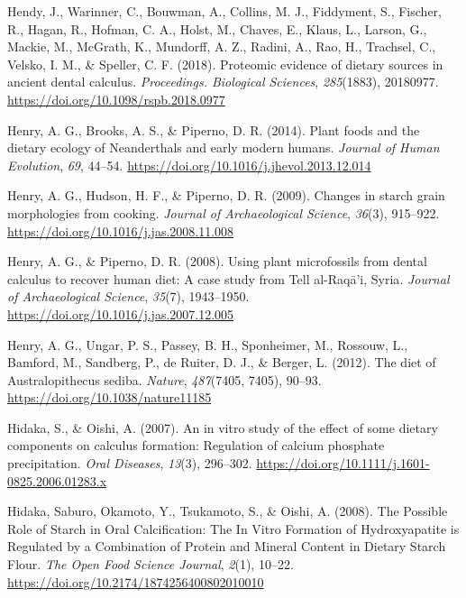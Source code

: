 \documentclass[
  letterpaper,
]{book}
\newlength{\cslhangindent}
\newlength{\cslentryspacingunit} %
\newenvironment{CSLReferences}[2] %
 {%
  \setlength{\parindent}{0pt}
  \ifodd #1
  \let\oldpar\par
  \def\par{\hangindent=\cslhangindent\oldpar}
  \fi
  \setlength{\parskip}{#2\cslentryspacingunit}
 }%
 {}
\begin{document}
\begin{CSLReferences}{1}{0}
\leavevmode{}%
Hendy, J., Warinner, C., Bouwman, A., Collins, M. J., Fiddyment, S.,
Fischer, R., Hagan, R., Hofman, C. A., Holst, M., Chaves, E., Klaus, L.,
Larson, G., Mackie, M., McGrath, K., Mundorff, A. Z., Radini, A., Rao,
H., Trachsel, C., Velsko, I. M., \& Speller, C. F. (2018). Proteomic
evidence of dietary sources in ancient dental calculus.
\emph{Proceedings. Biological Sciences}, \emph{285}(1883), 20180977.
\url{https://doi.org/10.1098/rspb.2018.0977}

\leavevmode{}%
Henry, A. G., Brooks, A. S., \& Piperno, D. R. (2014). Plant foods and
the dietary ecology of {Neanderthals} and early modern humans.
\emph{Journal of Human Evolution}, \emph{69}, 44--54.
\url{https://doi.org/10.1016/j.jhevol.2013.12.014}

\leavevmode{}%
Henry, A. G., Hudson, H. F., \& Piperno, D. R. (2009). Changes in starch
grain morphologies from cooking. \emph{Journal of Archaeological
Science}, \emph{36}(3), 915--922.
\url{https://doi.org/10.1016/j.jas.2008.11.008}

\leavevmode{}%
Henry, A. G., \& Piperno, D. R. (2008). Using plant microfossils from
dental calculus to recover human diet: A case study from {Tell}
al-{Raqā}'i, {Syria}. \emph{Journal of Archaeological Science},
\emph{35}(7), 1943--1950.
\url{https://doi.org/10.1016/j.jas.2007.12.005}

\leavevmode{}%
Henry, A. G., Ungar, P. S., Passey, B. H., Sponheimer, M., Rossouw, L.,
Bamford, M., Sandberg, P., de Ruiter, D. J., \& Berger, L. (2012). The
diet of {Australopithecus} sediba. \emph{Nature}, \emph{487}(7405,
7405), 90--93. \url{https://doi.org/10.1038/nature11185}

\leavevmode{}%
Hidaka, S., \& Oishi, A. (2007). An in vitro study of the effect of some
dietary components on calculus formation: Regulation of calcium
phosphate precipitation. \emph{Oral Diseases}, \emph{13}(3), 296--302.
\url{https://doi.org/10.1111/j.1601-0825.2006.01283.x}

\leavevmode{}%
Hidaka, Saburo, Okamoto, Y., Tsukamoto, S., \& Oishi, A. (2008). The
{Possible Role} of {Starch} in {Oral Calcification}: {The In Vitro
Formation} of {Hydroxyapatite} is {Regulated} by a {Combination} of
{Protein} and {Mineral Content} in {Dietary Starch Flour}. \emph{The
Open Food Science Journal}, \emph{2}(1), 10--22.
\url{https://doi.org/10.2174/1874256400802010010}


\end{CSLReferences}
\end{document}
